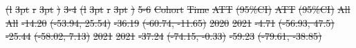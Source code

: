 \documentclass[
  letterpaper,
  DIV=11,
  numbers=noendperiod]{scrartcl}
\providecommand{\DIFdel}[1]{{\protect\color{red}\sout{#1}}}                      %
\providecommand{\DIFdelFL}[1]{\DIFdel{#1}} %
\begin{document}
\DIFdelFL{(l}%
\DIFdelFL{3pt}%
\DIFdelFL{r}%
\DIFdelFL{3pt}%
\DIFdelFL{)}%
\DIFdelFL{3-4}%
\DIFdelFL{(l}%
\DIFdelFL{3pt}%
\DIFdelFL{r}%
\DIFdelFL{3pt}%
\DIFdelFL{)}%
\DIFdelFL{5-6}%
\DIFdelFL{Cohort }%
\DIFdelFL{Time }%
\DIFdelFL{ATT }%
\DIFdelFL{(95\%CI) }%
\DIFdelFL{ATT }%
\DIFdelFL{(95\%CI)}%
\DIFdelFL{All }%
\DIFdelFL{All }%
\DIFdelFL{-14.20 }%
\DIFdelFL{(-53.94, 25.54) }%
\DIFdelFL{-36.19 }%
\DIFdelFL{(-60.74, -11.65)}%
\DIFdelFL{2020 }%
\DIFdelFL{2021 }%
\DIFdelFL{-4.71 }%
\DIFdelFL{(-56.93, 47.5) }%
\DIFdelFL{-25.44 }%
\DIFdelFL{(-58.02, 7.13)}%
\DIFdelFL{2021 }%
\DIFdelFL{2021 }%
\DIFdelFL{-37.24 }%
\DIFdelFL{(-74.15, -0.33) }%
\DIFdelFL{-59.23 }%
\DIFdelFL{(-79.61, -38.85)}%
\end{document}
